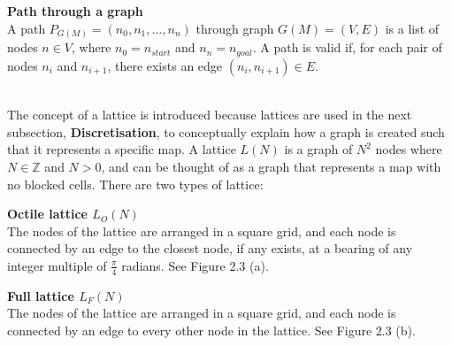 \documentclass[12pt,notitlepage]{report}
\begin{document}
\begin{description}
\item{\bfseries Path through a graph}\\
A path $P_{G(M)} = (n_{0}, n_{1}, \ldots, n_{n})$ through graph $G(M)=(V,E)$ is a list of nodes $n \in V$, where $n_{0}=n_{start}$ and $n_{n}=n_{goal}$. A path is valid if, for each pair of nodes $n_{i}$ and $n_{i+1}$, there exists an edge $(n_{i},n_{i+1}) \in E$.
\end{description}

\\
\noindent
The concept of a lattice is introduced because lattices are used in the next subsection, {\bfseries Discretisation}, to conceptually explain how a graph is created such that it represents a specific map. A lattice $L(N)$ is a graph of $N^{2}$ nodes where $N \in\mathbb{Z}$ and $N > 0$, and can be thought of as a graph that represents a map with no blocked cells. There are two types of lattice:\\

\begin{description}
\item{\bfseries Octile lattice $L_{O}(N)$}\\The nodes of the lattice are arranged in a square grid, and each node is connected by an edge to the closest node, if any exists, at a bearing of any integer multiple of $\frac{\pi}{4}$ radians. See Figure 2.3 (a).

\item{\bfseries Full lattice $L_{F}(N)$}\\The nodes of the lattice are arranged in a square grid, and each node is connected by an edge to every other node in the lattice. See Figure 2.3 (b).
\end{description}
\end{document}
